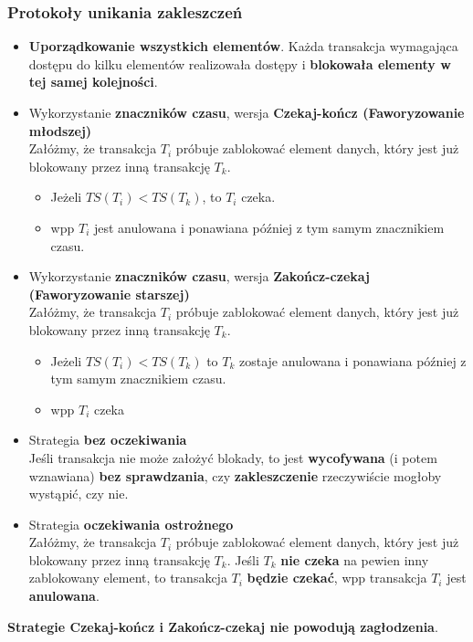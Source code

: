 \documentclass[a4paper]{article}
\begin{document}
\subsubsection{Protokoły unikania zakleszczeń}
\begin{itemize}
    \item \textbf{Uporządkowanie	wszystkich	elementów}.	Każda	transakcja	wymagająca	 dostępu	 do	 kilku	 elementów	 realizowała	 dostępy	 i	 \textbf{blokowała	 elementy w tej samej kolejności}.
    \item Wykorzystanie	\textbf{znaczników	czasu},	wersja	\textbf{Czekaj-kończ (Faworyzowanie młodszej)}\\
    Załóżmy,	 że	 transakcja	 $T_i$ próbuje	 zablokować	 element	 danych,	 który	 jest	 już	 blokowany przez	inną transakcję	$T_k$.
    \begin{itemize}
        \item Jeżeli $TS(T_i) < TS(T_k)$, to $T_i$ czeka.
        \item wpp $T_i$ jest	anulowana	i	ponawiana	później	z	tym	samym znacznikiem	czasu.
    \end{itemize}

    \item Wykorzystanie	\textbf{znaczników	czasu},	wersja	\textbf{Zakończ-czekaj (Faworyzowanie starszej)}\\
    Załóżmy,	 że	 transakcja	 $T_i$ próbuje	 zablokować	 element	 danych,	 który	 jest	 już	 blokowany przez	inną transakcję	$T_k$.
    \begin{itemize}
        \item Jeżeli $TS(T_i) < TS(T_k)$ to $T_k$ zostaje anulowana	i	ponawiana	później	z	 tym	samym	znacznikiem	czasu.
        \item wpp $T_i$ czeka
    \end{itemize}
    
    \item Strategia	 \textbf{bez oczekiwania}\\
    Jeśli	 transakcja	 nie	 może	 założyć	 blokady,	 to	 jest \textbf{wycofywana}	(i	potem	wznawiana)	\textbf{bez	sprawdzania}, czy \textbf{zakleszczenie}	rzeczywiście	mogłoby	wystąpić,	czy	nie.
    \item Strategia	\textbf{oczekiwania	ostrożnego}\\
    Załóżmy,	 że	 transakcja	 $T_i$ próbuje	 zablokować	 element	 danych,	 który	 jest	 już	 blokowany przez	inną transakcję	$T_k$. Jeśli	 $T_k$ \textbf{nie	 czeka}	 na	 pewien	 inny	 zablokowany	 element,	 to	 transakcja	 $T_i$ \textbf{będzie	 czekać}, wpp	transakcja	$T_i$ jest	\textbf{anulowana}.
\end{itemize}
\textbf{Strategie	Czekaj-kończ	i	Zakończ-czekaj	nie	powodują	zagłodzenia}.
\end{document}
